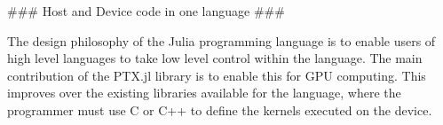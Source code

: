 \begin{markdown}
### Host and Device code in one language ###

The design philosophy of the Julia programming language is to enable
users of high level languages to take low level control within the
language. The main contribution of the PTX.jl library is to enable
this for GPU computing. This improves over the existing libraries
available for the language, where the programmer must use C or C++ to
define the kernels executed on the device.

\end{markdown}

